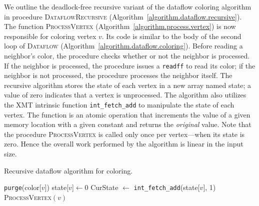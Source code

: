 \documentclass{article}
\begin{document}
We outline the deadlock-free recursive variant of the dataflow coloring
algorithm in procedure \textsc{DataflowRecursive} (Algorithm~\ref{algorithm.dataflow.recursive}).
The function \textsc{ProcessVertex} (Algorithm~\ref{algorithm.process.vertex}) 
is now responsible for coloring vertex $v$.
Its code is similar to the body of the second loop of
\textsc{Dataflow} (Algorithm~\ref{algorithm.dataflow.coloring}).
Before reading a neighbor's color, the procedure checks whether or not the neighbor is processed.
If the neighbor is processed, the procedure issues a \texttt{readff} to read its color; if the neighbor
is not processed, the procedure processes the neighbor itself.
The recursive algorithm stores the state of each vertex in a new array named \textsf{state}; a value of
zero indicates that a vertex is unprocessed. 
The algorithm also utilizes the XMT intrinsic function \texttt{int\_fetch\_add} to manipulate
the state of each vertex.
The function is an atomic operation that increments the value of a given memory location 
with a given constant and returns the {\em original} value.  
Note that the procedure \textsc{ProcessVertex} is called only once per vertex---when its 
state is zero. Hence the overall work performed by the algorithm is linear in the input size. 

\begin{algorithm}[t]
\small
\caption{Recursive dataflow algorithm for coloring.}
\label{algorithm.dataflow.recursive}
\begin{algorithmic}[1]
      \State \texttt{purge}(\textsf{color}[$v$]) 
      \State \textsf{state}[$v$]$\gets 0$
  \EndFor
      \State CurState $\gets$ \texttt{int\_fetch\_add}(\textsf{state}[$v$], 1) 
           \State \textsc{ProcessVertex}$(v)$
       \EndIf
  \EndFor
\EndProcedure
\end{algorithmic}
\end{algorithm}
\end{document}
